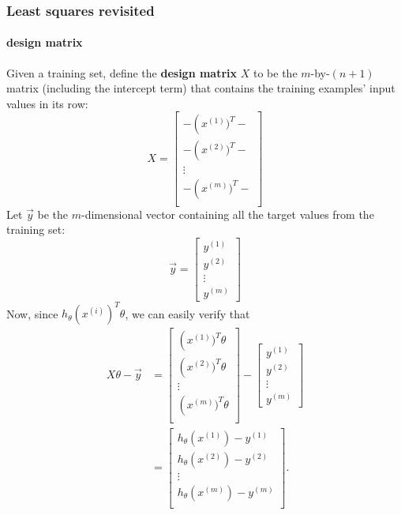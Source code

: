 \documentclass{article}
\begin{document}
\subsubsection{Least squares revisited}
\paragraph{design matrix} Given a training set, define the \textbf{design matrix} $X$ to be the $m$-by-$(n+1)$ matrix (including the intercept term) that contains the training examples' input values in its row:
\begin{equation}
	\label{eq:design_matrix}
	X = 
	\begin{bmatrix}
		- \left(x^{(1)})^T -\\
		- \left(x^{(2)})^T -\\
		\vdots \\
		- \left(x^{(m)})^T -\\
	\end{bmatrix}
\end{equation}
Let $\vec{y}$ be the $m$-dimensional vector containing all the target values from the training set:
\begin{equation}
	\label{eq:target_values}
	\vec{y} =
	\begin{bmatrix}
		y^{(1)} \\
		y^{(2)} \\
		\vdots \\
		y^{(m)} 
	\end{bmatrix}
\end{equation}
Now, since $h_\theta\left(x^{(i)}\right)^T\theta$, we can easily verify that
\begin{align*}
	X\theta - \vec{y} &= 
	\begin{bmatrix}
		\left(x^{(1)})^T\theta \\
		\left(x^{(2)})^T\theta \\
		\vdots \\
		\left(x^{(m)})^T\theta \\
	\end{bmatrix}
	-
	\begin{bmatrix}
		y^{(1)} \\
		y^{(2)} \\
		\vdots \\
		y^{(m)} 
	\end{bmatrix} \\
	&= 
	\begin{bmatrix}
		h_\theta\left(x^{(1)}\right) - y^{(1)} \\
		h_\theta\left(x^{(2)}\right) - y^{(2)} \\
		\vdots \\ 
		h_\theta\left(x^{(m)}\right) - y^{(m)} \\
	\end{bmatrix}.
\end{align*}
\end{document}
